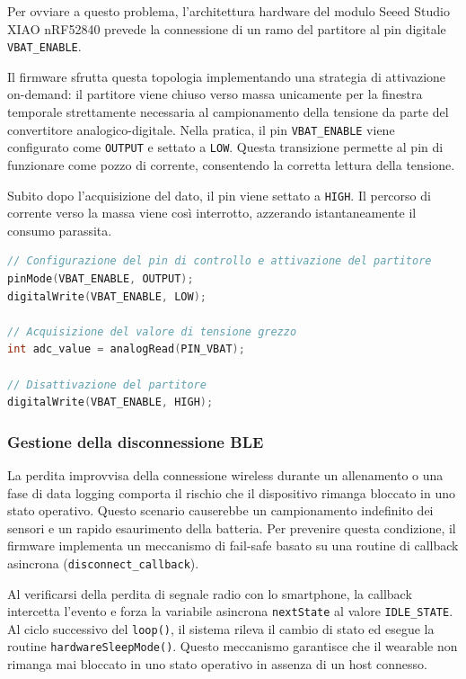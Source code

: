 Per ovviare a questo problema, l'architettura hardware del modulo Seeed Studio XIAO nRF52840 prevede la connessione di un ramo del partitore al pin digitale \texttt{VBAT\_ENABLE}.

Il firmware sfrutta questa topologia implementando una strategia di attivazione on-demand: il partitore viene chiuso verso massa unicamente per la finestra temporale strettamente necessaria al campionamento della tensione da parte del convertitore analogico-digitale.
Nella pratica, il pin \texttt{VBAT\_ENABLE} viene configurato come \texttt{OUTPUT} e settato a \texttt{LOW}. Questa transizione permette al pin di funzionare come pozzo di corrente, consentendo la corretta lettura della tensione.

Subito dopo l'acquisizione del dato, il pin viene settato a \texttt{HIGH}. Il percorso di corrente verso la massa viene così interrotto, azzerando istantaneamente il consumo parassita.

\begin{lstlisting}[language=C++, caption={Implementazione software della lettura della tensione della batteria.}]
// Configurazione del pin di controllo e attivazione del partitore
pinMode(VBAT_ENABLE, OUTPUT);
digitalWrite(VBAT_ENABLE, LOW);

// Acquisizione del valore di tensione grezzo
int adc_value = analogRead(PIN_VBAT);

// Disattivazione del partitore
digitalWrite(VBAT_ENABLE, HIGH);
\end{lstlisting}

\subsubsection{Gestione della disconnessione BLE}
La perdita improvvisa della connessione wireless durante un allenamento o una fase di data logging comporta il rischio che il dispositivo rimanga bloccato in uno stato operativo. Questo scenario causerebbe un campionamento indefinito dei sensori e un rapido esaurimento della batteria.
Per prevenire questa condizione, il firmware implementa un meccanismo di fail-safe basato su una routine di callback asincrona (\texttt{disconnect\_callback}).

Al verificarsi della perdita di segnale radio con lo smartphone, la callback intercetta l'evento e forza la variabile asincrona \texttt{nextState} al valore \texttt{IDLE\_STATE}. Al ciclo successivo del \texttt{loop()}, il sistema rileva il cambio di stato ed esegue la routine \texttt{hardwareSleepMode()}.
Questo meccanismo garantisce che il wearable non rimanga mai bloccato in uno stato operativo in assenza di un host connesso.

